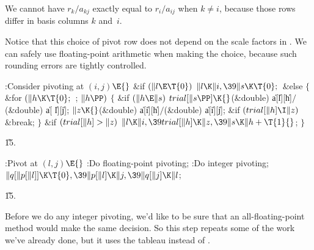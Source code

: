 We cannot have $r_k/a_{kj}$ exactly equal to $r_i/a_{ij}$ when $k\ne i$,
because those rows differ in basis columns $k$ and~$i$.

Notice that this choice of pivot row does not depend on
the scale factors in . We can safely use floating-point
arithmetic
when making the choice, because such rounding errors are tightly controlled.

\Y\B\4:Consider pivoting at $(i,j)$\X${}\E{}$\6
\&{if} ${}(\|l\E\T{0}){}$\1\5
${}\|l\K\|i,\39\|s\K\T{0};{}$\2\6
\&{else}\5
${}\{{}$\1\6
\&{for} ${}(\|h\K\T{0};{}$  ; ${}\|h\PP){}$\5
${}\{{}$\1\6
\&{if} ${}(\|h\E\|s){}$\1\5
${}\\{trial}[\|s\PP]\K{}$(\&{double}) \|a[\|l][\|h]${}/{}$(\&{double}) \|a[%
\|l][\|j];\2\6
${}\|z\K{}$(\&{double}) \|a[\|i][\|h]${}/{}$(\&{double}) \|a[\|i][\|j];\6
\&{if} ${}(\\{trial}[\|h]\I\|z){}$\1\5
\&{break};\2\6
\4${}\}{}$\2\6
\&{if} ${}(\\{trial}[\|h]>\|z){}$\1\5
${}\|l\K\|i,\39\\{trial}[\|h]\K\|z,\39\|s\K\|h+\T{1}{}$;\2\6
\4${}\}{}$\2\par
\U15.\fi

\B{}:Pivot at $(l,j)$\X${}\E{}$\6
:Do floating-point pivoting\X;\6
:Do integer pivoting\X;\6
${}\|q[\|p[\|l]]\K\T{0},\39\|p[\|l]\K\|j,\39\|q[\|j]\K\|l{}$;\par
\U15.\fi

Before we do any integer pivoting, we'd like to be sure that
an all-floating-point method would make the same decision.
So this step repeats some of the work we've already done, but
it uses the  tableau instead of .

